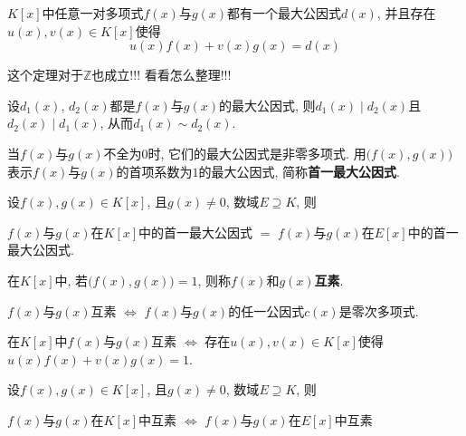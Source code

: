 \begin{Theorem}[!]
$K[x]$中任意一对多项式$f(x)$与$g(x)$都有一个最大公因式$d(x)$, 并且存在$u(x), v(x) \in K[x]$使得
\[
	u(x) f(x) + v(x) g(x) = d(x)
\]
\end{Theorem}

\begin{Thoughts}
这个定理对于$\mathbb{Z}$也成立!!! 看看怎么整理!!!
\end{Thoughts}

\begin{Note}
设$d_1(x)$, $d_2(x)$都是$f(x)$与$g(x)$的最大公因式, 则$d_1(x) \mid d_2(x)$且$d_2(x) \mid d_1(x)$, 从而$d_1(x) \sim d_2(x)$.
\end{Note}

\begin{Note}
当$f(x)$与$g(x)$不全为$0$时, 它们的最大公因式是非零多项式. 用$\Big( f(x), g(x) \Big)$表示$f(x)$与$g(x)$的首项系数为$1$的最大公因式,
简称\textbf{首一最大公因式}.
\end{Note}

\begin{Proposition}[首一最大公因式不随数域的扩大而改变]
设$f(x), g(x) \in K[x]$, 且$g(x) \neq 0$, 数域$E \supseteq K$, 则
\begin{center}
$f(x)$与$g(x)$在$K[x]$中的首一最大公因式 $=$ $f(x)$与$g(x)$在$E[x]$中的首一最大公因式.
\end{center}
\end{Proposition}

\begin{Definition}[互素]
在$K[x]$中, 若$\Big( f(x), g(x) \Big) = 1$, 则称$f(x)$和$g(x)$\textbf{互素}.
\end{Definition}

\begin{Note}
$f(x)$与$g(x)$互素 $\iff$ $f(x)$与$g(x)$的任一公因式$c(x)$是零次多项式.
\end{Note}

\begin{Theorem}[!]
在$K[x]$中$f(x)$与$g(x)$互素 $\iff$ 存在$u(x), v(x) \in K[x]$使得$u(x) f(x) +v(x) g(x) = 1$.
\end{Theorem}

\begin{Proposition}[互素性不随数域的扩大而改变]
设$f(x), g(x) \in K[x]$, 且$g(x) \neq 0$, 数域$E \supseteq K$, 则
\begin{center}
$f(x)$与$g(x)$在$K[x]$中互素 $\iff$ $f(x)$与$g(x)$在$E[x]$中互素 
\end{center}
\end{Proposition}

